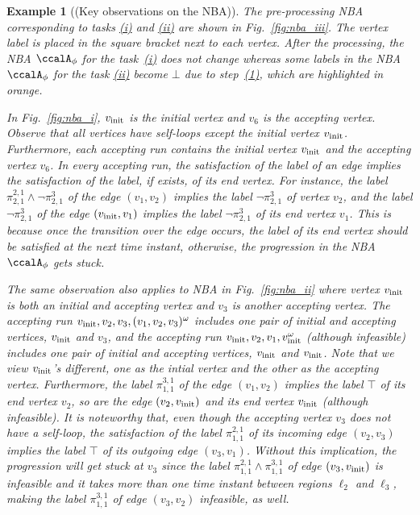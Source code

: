 \documentclass[Afour,sageh,times]{sagej}
\newtheorem{exmp}{Example}
\newcommand{\autop}{\ccalA_{\phi}}
\newcommand{\vertex}[1]{v_{\textup{#1}}}
\renewcommand{\ap}[3]{\mathcal{\pi}_{{#1},{#2}}^{#3}}
\newenvironment{cexmp}
{\addtocounter{exmp}{-1}\begin{exmp}}
  {\end{exmp}}
\begin{document}
 \begin{cexmp}[(Key observations on the NBA)]
   The pre-processing NBA corresponding to tasks \hyperref[task:i]{\it (i)} and \hyperref[task:i]{\it (ii)} are shown in Fig.~\ref{fig:nba_iii}. The vertex label is placed in the square bracket next to each vertex. After the processing, the NBA $\autop$ for the task~\hyperref[task:i]{\it (i)} does not change whereas some labels in the NBA $\autop$ for the task \hyperref[task:i]{\it (ii)} become $\bot$ due to step~\hyperref[prune:exclusion1]{\it (1)}, which are highlighted in orange.

   In Fig.~\ref{fig:nba_i}, $\vertex{init}$ is the initial vertex and $v_6$ is the accepting vertex. Observe that all vertices have self-loops except the initial vertex $\vertex{init}$. Furthermore, each accepting run contains the initial vertex $\vertex{init}$ and the accepting vertex $v_6$. In every accepting run, the satisfaction of the label of an edge implies the satisfaction of the label, if exists, of its end vertex. For instance, the label $\ap{2}{1}{2,1} \wedge \neg\ap{2}{1}{3}$ of the edge $(v_1, v_2)$ implies the label $\neg\ap{2}{1}{3}$ of vertex $v_2$, and  the label $\neg\ap{2}{1}{3}$ of the edge  $(\vertex{init}, v_1)$ implies the label $\neg\ap{2}{1}{3}$ of  its end vertex $v_1$. This is because once the transition over the edge occurs, the label of its end vertex should be satisfied at the next time instant, otherwise, the progression in the NBA $\autop$ gets stuck.

   The same observation also applies to NBA in Fig.~\ref{fig:nba_ii} where vertex $\vertex{init}$ is both an initial and accepting vertex and $v_3$ is another accepting vertex.  The accepting run $\vertex{init}, v_2, v_3, (v_1, v_2, v_3)^\omega$ includes one pair of initial and accepting vertices, $\vertex{init}$ and  $v_3$, and the accepting run $\vertex{init}, v_2, v_1, \vertex{init}^\omega$ (although infeasible) includes one pair of initial and accepting vertices, $\vertex{init}$ and $\vertex{init}$. Note that we view $\vertex{init}$'s different, one as the intial vertex and the other as the accepting vertex. Furthermore, the label $\ap{1}{1}{3,1}$ of the edge $(v_1, v_2)$  implies the label $\top$ of its end vertex $v_2$, so are the edge $(v_2, \vertex{init})$ and its end vertex $\vertex{init}$ (although infeasible). It is noteworthy that, even though the accepting vertex $v_3$ does not have a self-loop, the satisfaction of the label $\ap{1}{1}{2,1}$ of its incoming edge $(v_2, v_3)$ implies the label $\top$ of its outgoing edge $(v_3, v_1)$. Without this implication, the progression will get stuck at $v_3$ since the label $\ap{1}{1}{2,1} \wedge \ap{1}{1}{3,1}$ of edge $(v_3, \vertex{init})$ is infeasible and it takes more than one time instant between regions $\ell_2$ and $\ell_3$, making the label $\ap{1}{1}{3,1}$ of edge $(v_3, v_2)$ infeasible, as well.
 \end{cexmp}
\end{document}
